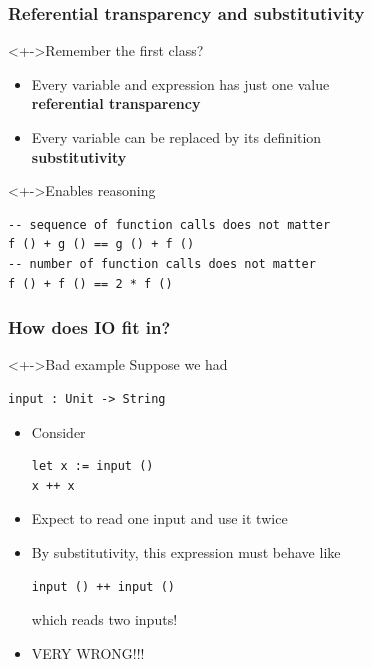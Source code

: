 \documentclass{beamer}
\subtitle{IO}
\begin{document}
\begin{frame}
  \titlepage
\end{frame}
\begin{frame}[fragile]
  \frametitle{Referential transparency and substitutivity}
  \begin{block}<+->{Remember the first class?}
    \begin{itemize}
    \item Every variable and expression has just one value\\
      \textbf{referential transparency}
    \item Every variable can be replaced by its definition\\
      \textbf{substitutivity}
    \end{itemize}
  \end{block}
  \begin{block}<+->{Enables reasoning}
\begin{lstlisting}
-- sequence of function calls does not matter
f () + g () == g () + f ()
-- number of function calls does not matter
f () + f () == 2 * f ()
\end{lstlisting}
  \end{block}
\end{frame}
\begin{frame}[fragile]
  \frametitle{How does IO fit in?}
  \begin{alertblock}<+->{Bad example}
    Suppose we had 
\begin{lstlisting}
input : Unit -> String
\end{lstlisting}
    \begin{itemize}
    \item<+-> Consider
\begin{lstlisting}
let x := input ()
x ++ x
\end{lstlisting}
    \item<+-> Expect to read one input and use it twice
    \item<+-> By substitutivity, this expression must behave like
\begin{lstlisting}
input () ++ input ()
\end{lstlisting}
      which reads two inputs!
    \item<+-> VERY WRONG!!!
  \end{itemize}
  \end{alertblock}
\end{frame}
\end{document}
